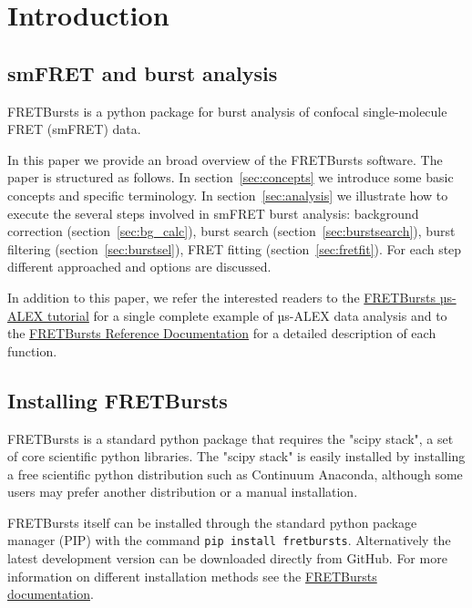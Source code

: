 \section{Introduction}

\subsection{smFRET and burst analysis}

FRETBursts is a python package for burst analysis of confocal single-molecule
FRET (smFRET) data.

In this paper we provide an broad overview of the FRETBursts software. The 
paper is structured as follows. In section~\ref{sec:concepts} we
introduce some basic concepts and specific terminology.
In section~\ref{sec:analysis} we illustrate how to execute the several steps involved
in smFRET burst analysis: background correction (section~\ref{sec:bg_calc}), burst search
(section~\ref{sec:burstsearch}), burst filtering (section~\ref{sec:burstsel}), 
FRET fitting (section~\ref{sec:fretfit}). For each step different approached and options 
are discussed.

In addition to this paper, we refer the interested readers to the 
\href{http://nbviewer.ipython.org/github/tritemio/FRETBursts_notebooks/blob/master/notebooks/FRETBursts\%20-\%20us-ALEX\%20smFRET\%20burst\%20analysis.ipynb}{FRETBursts µs-ALEX tutorial} 
for a single complete example of µs-ALEX data analysis and to the
\href{http://fretbursts.readthedocs.org/}{FRETBursts Reference Documentation}
for a detailed description of each function.

\subsection{Installing FRETBursts}
FRETBursts is a standard python package that requires the "scipy stack", a set
of core scientific python libraries.
The "scipy stack" is easily installed by installing a free scientific python
distribution such as Continuum Anaconda, although some users may prefer another
distribution or a manual installation.

FRETBursts itself can be installed through the standard python package manager (PIP)
with the command \texttt{pip install fretbursts}. 
Alternatively the latest development version can be downloaded directly 
from GitHub. For more information on different installation methods see the
\href{http://fretbursts.readthedocs.org/en/latest/installation.html}{FRETBursts
documentation}.

